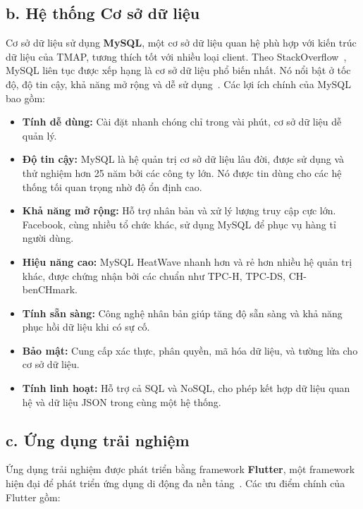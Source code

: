 \subsection*{b. Hệ thống Cơ sở dữ liệu}

Cơ sở dữ liệu sử dụng \textbf{MySQL}, một cơ sở dữ liệu quan hệ phù hợp với kiến trúc dữ liệu của TMAP, tương thích tốt với nhiều loại client. Theo StackOverflow~\cite{stackoverflow2021}, MySQL liên tục được xếp hạng là cơ sở dữ liệu phổ biến nhất. Nó nổi bật ở tốc độ, độ tin cậy, khả năng mở rộng và dễ sử dụng~\cite{oracle2022}.  
Các lợi ích chính của MySQL bao gồm:

\begin{itemize}
    \item \textbf{Tính dễ dùng:} Cài đặt nhanh chóng chỉ trong vài phút, cơ sở dữ liệu dễ quản lý.
    \item \textbf{Độ tin cậy:} MySQL là hệ quản trị cơ sở dữ liệu lâu đời, được sử dụng và thử nghiệm hơn 25 năm bởi các công ty lớn. Nó được tin dùng cho các hệ thống tối quan trọng nhờ độ ổn định cao.
    \item \textbf{Khả năng mở rộng:} Hỗ trợ nhân bản và xử lý lượng truy cập cực lớn. Facebook, cùng nhiều tổ chức khác, sử dụng MySQL để phục vụ hàng tỉ người dùng.
    \item \textbf{Hiệu năng cao:} MySQL HeatWave nhanh hơn và rẻ hơn nhiều hệ quản trị khác, được chứng nhận bởi các chuẩn như TPC-H, TPC-DS, CH-benCHmark.
    \item \textbf{Tính sẵn sàng:} Công nghệ nhân bản giúp tăng độ sẵn sàng và khả năng phục hồi dữ liệu khi có sự cố.
    \item \textbf{Bảo mật:} Cung cấp xác thực, phân quyền, mã hóa dữ liệu, và tường lửa cho cơ sở dữ liệu.
    \item \textbf{Tính linh hoạt:} Hỗ trợ cả SQL và NoSQL, cho phép kết hợp dữ liệu quan hệ và dữ liệu JSON trong cùng một hệ thống.
\end{itemize}

\subsection*{c. Ứng dụng trải nghiệm}

Ứng dụng trải nghiệm được phát triển bằng framework \textbf{Flutter}, một framework hiện đại để phát triển ứng dụng di động đa nền tảng~\cite{flutter2022}. Các ưu điểm chính của Flutter gồm:


